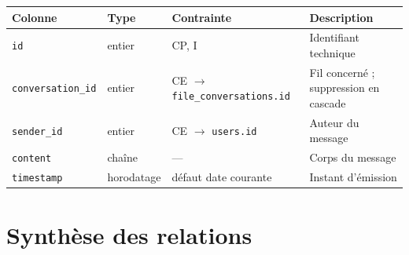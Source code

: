 \begin{table}[H]
\centering
\small
\begin{tabular}{@{}lllL{5.8cm}@{}}
\toprule
\textbf{Colonne} & \textbf{Type} & \textbf{Contrainte} & \textbf{Description} \\
\midrule
\texttt{id}               & entier     & CP, I & Identifiant technique \\
\texttt{conversation\_id} & entier     & CE $\to$ \texttt{file\_conversations.id} &
                                          Fil concerné ; suppression en cascade \\
\texttt{sender\_id}       & entier     & CE $\to$ \texttt{users.id} & Auteur du
                                          message \\
\texttt{content}          & chaîne     & --- & Corps du message \\
\texttt{timestamp}        & horodatage & défaut date courante & Instant d'émission \\
\bottomrule
\end{tabular}
\end{table}

\section{Synthèse des relations}

